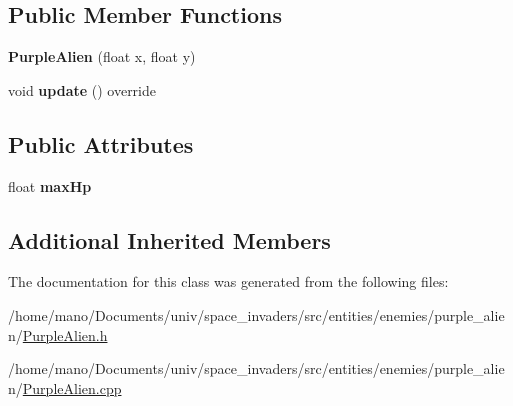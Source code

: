 \subsection*{Public Member Functions}
\begin{DoxyCompactItemize}
\item 
\mbox{\label{classentities_1_1enemies_1_1purple__alien_1_1PurpleAlien_a19496a9f49da18c9c260f98194e695e6}} 
{\bfseries Purple\+Alien} (float x, float y)
\item 
\mbox{\label{classentities_1_1enemies_1_1purple__alien_1_1PurpleAlien_a2e9d3a7d34dc72d7541ccb572b6d5a11}} 
void {\bfseries update} () override
\end{DoxyCompactItemize}
\subsection*{Public Attributes}
\begin{DoxyCompactItemize}
\item 
\mbox{\label{classentities_1_1enemies_1_1purple__alien_1_1PurpleAlien_aacaf3e961373d9ef3a0d05758a811860}} 
float {\bfseries max\+Hp}
\end{DoxyCompactItemize}
\subsection*{Additional Inherited Members}


The documentation for this class was generated from the following files\+:\begin{DoxyCompactItemize}
\item 
/home/mano/\+Documents/univ/space\+\_\+invaders/src/entities/enemies/purple\+\_\+alien/\hyperlink{PurpleAlien_8h}{Purple\+Alien.\+h}\item 
/home/mano/\+Documents/univ/space\+\_\+invaders/src/entities/enemies/purple\+\_\+alien/\hyperlink{PurpleAlien_8cpp}{Purple\+Alien.\+cpp}\end{DoxyCompactItemize}
